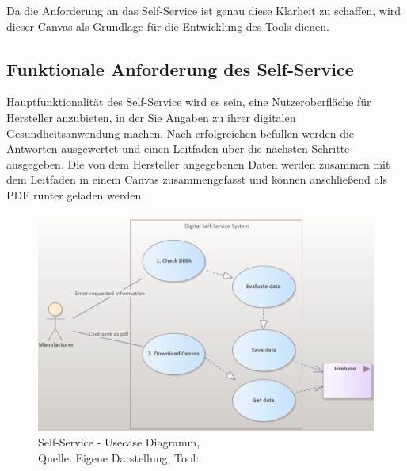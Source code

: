 Da die Anforderung an das Self-Service ist genau diese Klarheit zu schaffen, wird dieser Canvas als Grundlage für die Entwicklung des Tools dienen.

\subsection{Funktionale Anforderung des Self-Service}
Hauptfunktionalität des Self-Service wird es sein, eine Nutzeroberfläche für Hersteller anzubieten, in der Sie Angaben zu ihrer digitalen Gesundheitsanwendung machen.
Nach erfolgreichen befüllen werden die Antworten ausgewertet und einen Leitfaden über die nächsten Schritte ausgegeben. Die von dem Hersteller angegebenen Daten werden zusammen mit dem Leitfaden in einem Canvas zusammengefasst und können anschließend als PDF runter geladen werden.
\begin{figure}[H]
	\centering
	\includegraphics[width=450px, keepaspectratio]{assets/usecase1.png}
	\caption[Self-Service - Usecase Diagramm]{Self-Service - Usecase Diagramm,\\Quelle: Eigene Darstellung, Tool: \cite{enterpriseArchitect}}
\end{figure}
